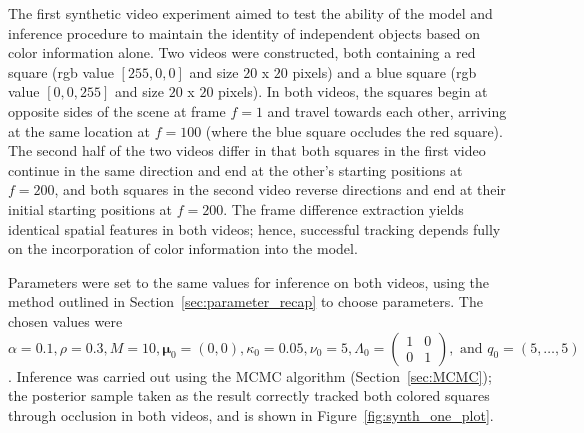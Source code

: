 \documentclass[smallcondensed, final]{svjour3}
\begin{document}
The first synthetic video experiment aimed to test the ability of the model and inference procedure to maintain the identity of independent objects based on color information alone. Two videos were constructed, both containing a red square (rgb value $[255,0,0]$ and size $20$ x $20$ pixels) and a blue square (rgb value $[0,0,255]$ and size $20$ x $20$ pixels). In both videos, the squares begin at opposite sides of the scene at frame $f=1$ and travel towards each other, arriving at the same location at $f=100$ (where the blue square occludes the red square). The second half of the two videos differ in that both squares in the first video continue in the same direction and end at the other's starting positions at $f=200$, and both squares in the second video reverse directions and end at their initial starting positions at $f=200$. The frame difference extraction yields identical spatial features in both videos; hence, successful tracking depends fully on the incorporation of color information into the model.

Parameters were set to the same values for inference on both videos, using the method outlined in Section~\ref{sec:parameter_recap} to choose parameters. The chosen values were $\alpha = 0.1, \rho = 0.3, M = 10, \boldsymbol{\mu}_{0} = (0,0), \kappa_{0} = 0.05, \nu_{0} = 5, \Lambda_{0} = \left( \begin{smallmatrix} 1&0\\ 0&1 \end{smallmatrix} \right), \text{ and } q_{0} = (5, \ldots, 5)$. Inference was carried out using the MCMC algorithm (Section~\ref{sec:MCMC}); the posterior sample taken as the result correctly tracked both colored squares through occlusion in both videos, and is shown in Figure~\ref{fig:synth_one_plot}. 

\end{document}
